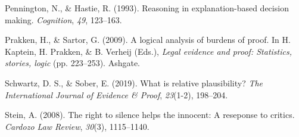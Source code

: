 \documentclass[]{book}
\begin{document}
\hypertarget{ref-penn1993}{}
Pennington, N., \& Hastie, R. (1993). Reasoning in explanation-based
decision making. \emph{Cognition}, \emph{49}, 123--163.

\hypertarget{ref-prakken2009}{}
Prakken, H., \& Sartor, G. (2009). A logical analysis of burdens of
proof. In H. Kaptein, H. Prakken, \& B. Verheij (Eds.), \emph{Legal
evidence and proof: Statistics, stories, logic} (pp. 223--253). Ashgate.

\hypertarget{ref-schwartz2019WhatRelativePlausibility}{}
Schwartz, D. S., \& Sober, E. (2019). What is relative plausibility?
\emph{The International Journal of Evidence \& Proof}, \emph{23}(1-2),
198--204.

\hypertarget{ref-stein2008}{}
Stein, A. (2008). The right to silence helps the innocent: A reseponse
to critics. \emph{Cardozo Law Review}, \emph{30}(3), 1115--1140.
\end{document}
